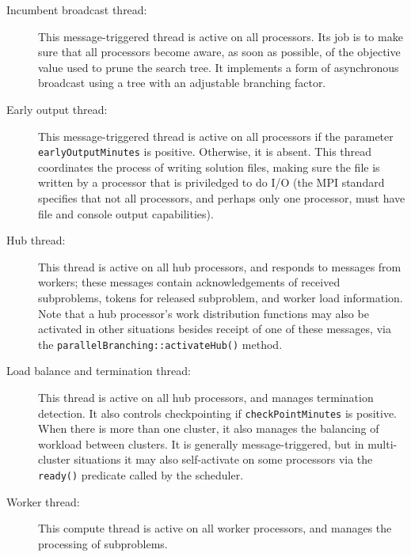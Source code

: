 \begin{description}

\item[Incumbent broadcast thread:] This message-triggered thread is
  active on all processors.  Its job is to make sure that all
  processors become aware, as soon as possible, of the objective value
  used to prune the search tree.  It implements a form of
  asynchronous broadcast using a tree with an adjustable branching
  factor.

\item[Early output thread:] This message-triggered thread is active on
  all processors if the parameter \texttt{earlyOutputMinutes} is
  positive.  Otherwise, it is absent. This thread coordinates the
  process of writing solution files, making sure the file is written
  by a processor that is priviledged to do I/O (the MPI standard
  specifies that not all processors, and perhaps only one processor,
  must have file and console output capabilities).

\item[Hub thread:]  This thread is active on all hub processors, and
  responds to messages from workers; these messages contain
  acknowledgements of received subproblems, tokens for released
  subproblem, and worker load information.  Note that a hub
  processor's work distribution functions may also be activated in
  other situations besides receipt of one of these messages, via the
  \texttt{parallelBranching::activateHub()} method. 

\item[Load balance and termination thread:] This thread is active on
  all hub processors, and manages termination detection.  It also
  controls checkpointing if \texttt{checkPointMinutes} is positive.  When
  there is more than one cluster, it also manages the balancing of
  workload between clusters.  It is generally message-triggered, but
  in multi-cluster situations it may also self-activate on some
  processors via the \texttt{ready()} predicate called by the scheduler.

\item[Worker thread:] This compute thread is active on all worker
  processors, and manages the processing of subproblems.


\end{description}
